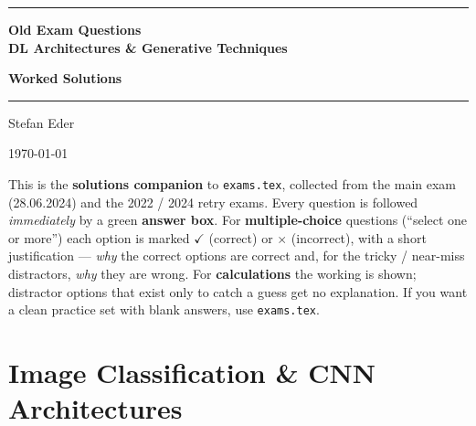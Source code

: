 \documentclass[11pt,oneside]{article}
\newcommand{\coursetitle}{DL Architectures \& Generative Techniques}
\newcounter{question}
\begin{document}
\thispagestyle{empty}
\vspace*{1.4cm}
\begin{center}
  {\color{accent}\rule{\linewidth}{1.8pt}}\par
  \vspace{0.65cm}
  {\fontsize{26}{32}\selectfont\bfseries\color{accent}Old Exam Questions\\[2pt] \coursetitle\par}
  \vspace{0.25cm}
  {\Large\color{key@frame}\bfseries Worked Solutions\par}
  \vspace{0.55cm}
  {\color{accent!35}\rule{\linewidth}{0.5pt}}\par
  \vspace{0.55cm}
  {\large Stefan Eder\par}
  \vspace{0.15cm}
  {\small\color{gray!70}\today\par}
\end{center}

\vspace{0.9cm}
\begin{notebox}
This is the \textbf{solutions companion} to \texttt{exams.tex}, collected from the main exam
(28.06.2024) and the 2022 / 2024 retry exams. Every question is followed \emph{immediately} by a
green \textbf{answer box}. For \textbf{multiple-choice} questions (``select one or more'') each
option is marked \textcolor{ok}{\ensuremath{\checkmark}} (correct) or
\textcolor{bad}{\ensuremath{\bm\times}} (incorrect), with a short justification --- \emph{why} the
correct options are correct and, for the tricky / near-miss distractors, \emph{why} they are wrong.
For \textbf{calculations} the working is shown; distractor options that exist only to catch a guess
get no explanation. If you want a clean practice set with blank answers, use \texttt{exams.tex}.
\end{notebox}

\tableofcontents
\newpage


\section{Image Classification \& CNN Architectures}
\end{document}
